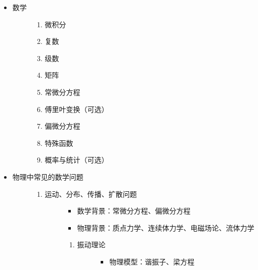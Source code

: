 \documentclass[a4paper,10pt,english]{sphinxmanual}
\begin{document}
\label{\detokenize{4. ChooseYourSkill:id4}}\begin{itemize}
\item {} \begin{description}
\item[{数学}] \leavevmode\begin{enumerate}
\item {} 
微积分

\item {} 
复数

\item {} 
级数

\item {} 
矩阵

\item {} 
常微分方程

\item {} 
傅里叶变换（可选）

\item {} 
偏微分方程

\item {} 
特殊函数

\item {} 
概率与统计（可选）

\end{enumerate}

\end{description}

\item {} \begin{description}
\item[{物理中常见的数学问题}] \leavevmode\begin{enumerate}
\item {} \begin{description}
\item[{运动、分布、传播、扩散问题}] \leavevmode\begin{itemize}
\item {} 
数学背景：常微分方程、偏微分方程

\item {} 
物理背景：质点力学、连续体力学、电磁场论、流体力学

\end{itemize}
\begin{enumerate}
\item {} \begin{description}
\item[{振动理论}] \leavevmode\begin{itemize}
\item {} 
物理模型：谐振子、梁方程


\end{itemize}
\end{description}
\end{enumerate}
\end{description}
\end{enumerate}
\end{description}
\end{itemize}
\end{document}
